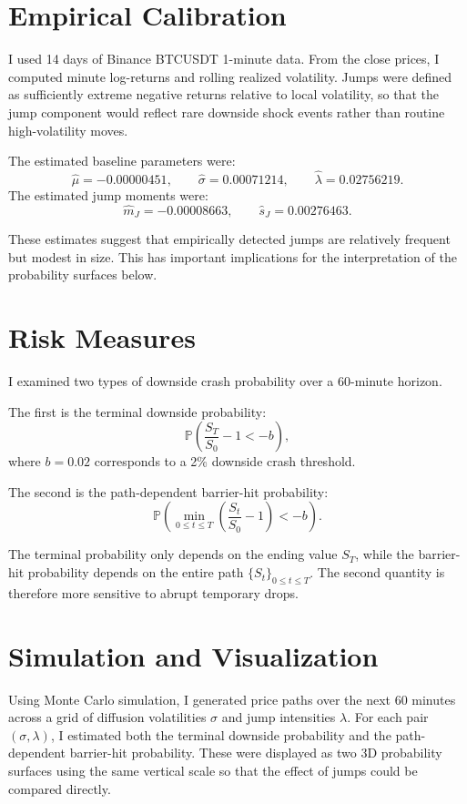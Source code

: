 \documentclass[11pt]{article}
\begin{document}
\section*{Empirical Calibration}

I used 14 days of Binance BTCUSDT 1-minute data. From the close prices, I computed minute log-returns and rolling realized volatility. Jumps were defined as sufficiently extreme negative returns relative to local volatility, so that the jump component would reflect rare downside shock events rather than routine high-volatility moves.

The estimated baseline parameters were:
\[
\hat{\mu} = -0.00000451, \qquad
\hat{\sigma} = 0.00071214, \qquad
\hat{\lambda} = 0.02756219.
\]
The estimated jump moments were:
\[
\hat{m}_J = -0.00008663, \qquad
\hat{s}_J = 0.00276463.
\]

These estimates suggest that empirically detected jumps are relatively frequent but modest in size. This has important implications for the interpretation of the probability surfaces below.

\section*{Risk Measures}

I examined two types of downside crash probability over a 60-minute horizon.

The first is the terminal downside probability:
\[
\mathbb{P}\left(\frac{S_T}{S_0} - 1 < -b\right),
\]
where \(b=0.02\) corresponds to a 2\% downside crash threshold.

The second is the path-dependent barrier-hit probability:
\[
\mathbb{P}\left(\min_{0 \le t \le T}\left(\frac{S_t}{S_0} - 1\right) < -b\right).
\]

The terminal probability only depends on the ending value \(S_T\), while the barrier-hit probability depends on the entire path \(\{S_t\}_{0 \le t \le T}\). The second quantity is therefore more sensitive to abrupt temporary drops.

\section*{Simulation and Visualization}

Using Monte Carlo simulation, I generated price paths over the next 60 minutes across a grid of diffusion volatilities \(\sigma\) and jump intensities \(\lambda\). For each pair \((\sigma,\lambda)\), I estimated both the terminal downside probability and the path-dependent barrier-hit probability. These were displayed as two 3D probability surfaces using the same vertical scale so that the effect of jumps could be compared directly.
\end{document}
